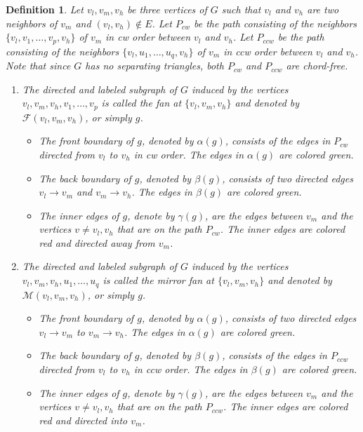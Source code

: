 \documentclass[11pt]{article}
\newcommand{\FF}{\mathcal{F}}
\newcommand{\MM}{\mathcal{M}}
\newtheorem{definition}[figure]{Definition}
\begin{document}
\begin{definition}\label{def:gadget}
Let $v_l,v_m,v_h$ be three vertices of $G$ such that
$v_l$ and $v_h$ are two neighbors of $v_m$ and $(v_l,v_h) \notin E$.
Let $P_{cw}$ be the path consisting of the neighbors $\{ v_l,v_1,\ldots,v_p,v_h\}$
of $v_m$ in cw order between $v_l$ and $v_h$.
Let $P_{ccw}$ be the path consisting of the neighbors $\{ v_l,u_1,\ldots,u_q,v_h\}$
of $v_m$ in ccw order between $v_l$ and $v_h$. Note that since $G$ has no
separating triangles, both $P_{cw}$ and $P_{ccw}$ are chord-free.
\begin{enumerate}

\item The directed and labeled subgraph
of $G$ induced by the vertices $v_l,v_m,v_h,v_1,\ldots,v_p$
is called the {\em fan at} $\{v_l, v_m, v_h\}$
and denoted by $\FF(v_l, v_m, v_h)$, or simply $g$.

\begin{itemize}
\item The \emph{front boundary} of $g$, denoted by $\alpha(g)$,
consists of the edges in $P_{cw}$ directed from $v_l$ to $v_h$ in cw order.
The edges in $\alpha(g)$ are colored green.

\item The \emph{back boundary} of $g$, denoted by $\beta(g)$,
consists of two directed edges $v_l \rightarrow v_m$ and $v_m \rightarrow  v_h$.
The edges in $\beta(g)$ are colored green.

\item The \emph{inner edges} of $g$, denote by $\gamma(g)$, are the edges
between $v_m$ and the vertices $v\neq v_l,v_h$ that are on the path
$P_{cw}$. The inner edges are colored red and directed away from $v_m$.
\end{itemize}

\item The directed and labeled
subgraph of $G$ induced by the vertices $v_l,v_m,v_h,u_1,\ldots,u_q$
is called the {\em mirror fan at} $\{v_l, v_m, v_h\}$
and denoted by $\MM(v_l, v_m, v_h)$, or simply $g$.

\begin{itemize}
\item The \emph{front boundary} of $g$, denoted by $\alpha(g)$,
consists of two directed edges $v_l\rightarrow v_m$ to $v_m\rightarrow v_h$.
The edges in $\alpha(g)$ are colored green.

\item The \emph{back boundary} of $g$, denoted by $\beta(g)$, consists
of the edges in $P_{ccw}$ directed from $v_l$ to $v_h$ in ccw order.
The edges in $\beta(g)$ are colored green.

\item The \emph{inner edges} of $g$, denote by $\gamma(g)$, are the edges
between $v_m$ and the vertices $v\neq v_l,v_h$ that are on the path
$P_{ccw}$. The inner edges are colored red and directed into $v_m$.
\end{itemize}
\end{enumerate}
\end{definition}
\end{document}
